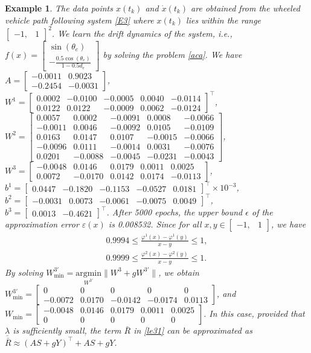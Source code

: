 \documentclass[journal,twoside,web]{ieeecolor}
\newtheorem{example}		[theorem]{Example}
\newcommand{\bbm}[1]{\left[\begin{matrix} #1 \end{matrix}\right]}
\begin{document}
\begin{example}
The data points $x(t_k)$ and $\dot{x}(t_k)$ are obtained from the wheeled vehicle path
following system \eqref{E3} where $x(t_k)$ lies within the range $\bbm{-1,&1}^2$. We learn the drift dynamics of the system, i.e., $f(x)=\bbm{\sin(\theta_e)\\-\frac{0.5\cos(\theta_e)}{1-0.5d_e}}$ by solving the problem \eqref{aca}. We have $A=\bbm{   -0.0011  &  0.9023\\
   -0.2454  & -0.0031}$, $W^1=  \bbm{0.0002 &   -0.0100 &   -0.0005 &   0.0040 &  -0.0114\\
   0.0122  & 0.0122  &  -0.0009  &  0.0062  & -0.0124   
}^\top$, $W^2=\bbm{    0.0057  &  0.0002 &  -0.0091   & 0.0008  & -0.0066\\
   -0.0011 &   0.0046 &  -0.0092  &  0.0105  & -0.0109\\
    0.0163  &  0.0147 &   0.0107 &  -0.0015  & -0.0066\\
   -0.0096  &  0.0111  & -0.0014  &  0.0031   &-0.0076\\
    0.0201&   -0.0088  & -0.0045  & -0.0231 &  -0.0043
}$, $W^3=\bbm{   -0.0048   & 0.0146  &  0.0179  &  0.0011  &  0.0025\\
    0.0072 &  -0.0170  &  0.0142  &  0.0174 &  -0.0113
}$, $b^1=\bbm{0.0447&
   -0.1820&
   -0.1153&
   -0.0527&
    0.0181
}^\top\times10^{-3}$, $b^2=\bbm{
         -0.0031&
    0.0073&
   -0.0061&
   -0.0075&
    0.0049
}^\top$, $b^3= \bbm{
            0.0013&
   -0.4621
}^{\top}$. After 5000 epochs, the upper bound $\epsilon$ of the approximation error $\varepsilon(x)$ is 0.008532. %
Since for all $x,y\in\bbm{-1,&1}$, we have
\begin{equation}\label{E32}
\begin{matrix}
 0.9994\leq\frac{\varphi^1 (x)-\varphi^1 (y)}{x-y}\leq 1,\\
0.9999\leq\frac{\varphi^2 (x)-\varphi^2 (y)}{x-y}\leq 1.
\end{matrix}
\end{equation} 
By solving $W_{\min}^{3'}=\underset{W^{3'}}{\text{argmin}} \|W^3+gW^{3'}\|$, we obtain $W_{\min}^{3'}=\bbm{
   0 &   0 &  0 &   0 & 0\\
   -0.0072 &  0.0170  &  -0.0142  &  -0.0174  & 0.0113
}$, and $W_{\min}=\bbm{
   -0.0048 &   0.0146   & 0.0179   & 0.0011 &   0.0025\\
   0 & 0 &  0  &  0  & 0       
}$. In this case, provided that $\underline{\lambda}$ is sufficiently small, the term $\bar{R}$ in \eqref{le31} can be approximated as $\bar{R}\approx (AS+gY)^\top + AS + gY$.


\end{example}
\end{document}
